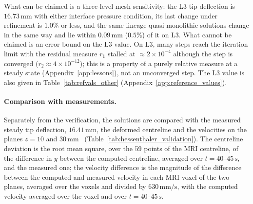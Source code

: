 What can be claimed is a three-level mesh sensitivity: the L3 tip deflection is $16.73\,\mathrm{mm}$ with either interface pressure condition, its last change under refinement is $1.0\%$ or less, and the same-lineage quasi-monolithic solutions change in the same way and lie within $0.09\,\mathrm{mm}$ ($0.5\%$) of it on L3.
What cannot be claimed is an error bound on the L3 value.
On L3, many steps reach the iteration limit with the residual measure $r_1$ stalled at $\approx2\times10^{-4}$ although the step is converged ($r_2 \approx 4\times10^{-12}$); this is a property of a purely relative measure at a steady state (Appendix~\ref{app:lessons}), not an unconverged step.
The L3 value is also given in Table~\ref{tab:refvals_other} (Appendix~\ref{app:reference_values}).

\paragraph{Comparison with measurements.}
Separately from the verification, the solutions are compared with the measured steady tip deflection, $16.41\,\mathrm{mm}$, the deformed centreline and the velocities on the planes $z = 10$ and $30\,\mathrm{mm}$~\citep{Hessenthaler2017a} (Table~\ref{tab:hessenthaler_validation}).
The centreline deviation is the root mean square, over the 59 points of the MRI centreline, of the difference in $y$ between the computed centreline, averaged over $t = 40$--$45\,\mathrm{s}$, and the measured one; the velocity difference is the magnitude of the difference between the computed and measured velocity in each MRI voxel of the two planes, averaged over the voxels and divided by $630\,\mathrm{mm/s}$, with the computed velocity averaged over the voxel and over $t = 40$--$45\,\mathrm{s}$.

